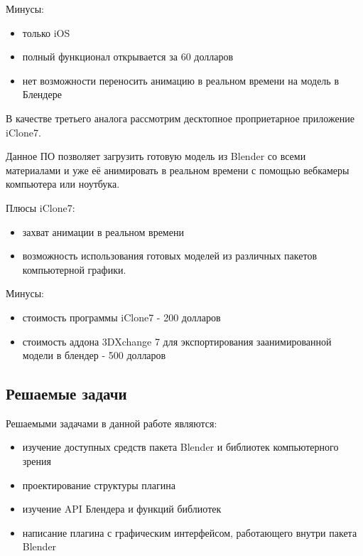 Минусы:
\begin{itemize}
	\item только iOS
	\item полный функционал открывается за 60 долларов
	\item нет возможности переносить анимацию в реальном времени на модель в Блендере
\end{itemize}

В качестве третьего аналога рассмотрим десктопное проприетарное приложение iClone7.

Данное ПО позволяет загрузить готовую модель из Blender со всеми материалами и уже её анимировать в реальном времени с помощью вебкамеры компьютера или ноутбука.

Плюсы iClone7:
\begin{itemize}
	\item захват анимации в реальном времени
	\item возможность использования готовых моделей из различных пакетов компьютерной графики.
\end{itemize}
Минусы:
\begin{itemize}
	\item стоимость программы iClone7 - 200 долларов
	\item стоимость аддона 3DXchange 7 для экспортирования заанимированной модели в блендер - 500 долларов
\end{itemize}


\subsection{Решаемые задачи}


Решаемыми задачами в данной работе являются:
\begin{itemize}
	\item изучение доступных средств пакета Blender и библиотек компьютерного зрения
	\item проектирование структуры плагина
	\item изучение API Блендера и функций библиотек 
	\item написание плагина с графическим интерфейсом, работающего внутри пакета Blender
\end{itemize}


\clearpage

